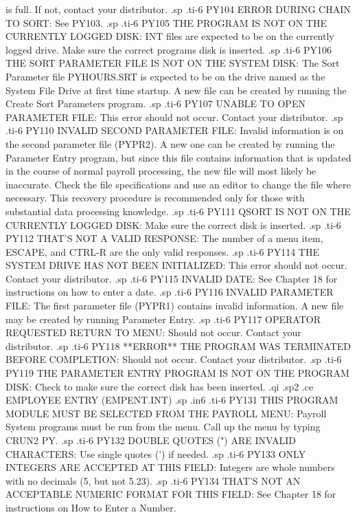 is full.  If not, contact your distributor.
.sp
.ti-6
PY104 ERROR DURING CHAIN TO SORT: See PY103.
.sp
.ti-6
PY105 THE PROGRAM IS NOT ON THE CURRENTLY LOGGED DISK:	INT files are
expected to be on the currently logged drive.  Make sure the correct
programs disk is inserted.
.sp
.ti-6
PY106 THE SORT PARAMETER FILE IS NOT ON THE SYSTEM DISK:  The Sort Parameter
file PYHOURS.SRT is expected to be on the drive named as the System File
Drive at first time startup.  A new file can be created by running the
Create Sort Parameters program.
.sp
.ti-6
PY107 UNABLE TO OPEN PARAMETER FILE: This error should not occur.  Contact
your distributor.
.sp
.ti-6
PY110 INVALID SECOND PARAMETER FILE:  Invalid information is on the second
parameter file (PYPR2).  A new one can be created by running the Parameter
Entry program, but since this file contains information that is updated
in the course of normal payroll processing, the new file will most likely
be inaccurate.	Check the file specifications and use an editor to change
the file where necessary.  This recovery procedure is recommended only for
those with substantial data processing knowledge.
.sp
.ti-6
PY111 QSORT IS NOT ON THE CURRENTLY LOGGED DISK: Make sure the correct
disk is inserted.
.sp
.ti-6
PY112 THAT'S NOT A VALID RESPONSE: The number of a menu item, ESCAPE, and
CTRL-R are the only valid responses.
.sp
.ti-6
PY114 THE SYSTEM DRIVE HAS NOT BEEN INITIALIZED: This error should not
occur.	Contact your distributor.
.sp
.ti-6
PY115 INVALID DATE: See Chapter 18 for instructions on how to enter a date.
.sp
.ti-6
PY116 INVALID PARAMETER FILE:  The first parameter file (PYPR1) contains
invalid information.  A new file may be created by running Parameter Entry.
.sp
.ti-6
PY117 OPERATOR REQUESTED RETURN TO MENU:  Should not occur.  Contact your
distributor.
.sp
.ti-6
PY118 **ERROR**  THE PROGRAM WAS TERMINATED BEFORE COMPLETION:	Should not
occur.	Contact your distributor.
.sp
.ti-6
PY119 THE PARAMETER ENTRY PROGRAM IS NOT ON THE PROGRAM DISK: Check to make
sure the correct disk has been inserted.
.qi
.sp2
.ce
EMPLOYEE ENTRY (EMPENT.INT)
.sp
.in6
.ti-6
PY131 THIS PROGRAM MODULE MUST BE SELECTED FROM THE PAYROLL MENU:
Payroll System programs must be run from the menu.  Call up the menu
by typing CRUN2 PY.
.sp
.ti-6
PY132 DOUBLE QUOTES (") ARE INVALID CHARACTERS: Use single quotes (') if
needed.
.sp
.ti-6
PY133 ONLY INTEGERS ARE ACCEPTED AT THIS FIELD: Integers are whole numbers
with no decimals (5, but not 5.23).
.sp
.ti-6
PY134 THAT'S NOT AN ACCEPTABLE NUMERIC FORMAT FOR THIS FIELD: See Chapter
18 for instructions on How to Enter a Number.
